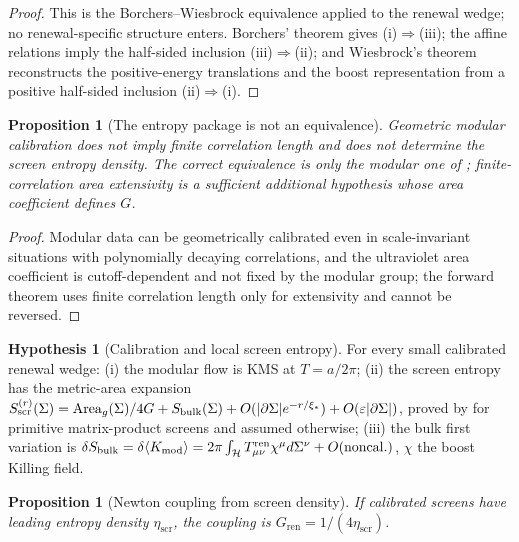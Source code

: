 \documentclass[11pt]{article}
\newtheorem{proposition}[theorem]{Proposition}
\theoremstyle{definition}
\newtheorem{hypothesis}[theorem]{Hypothesis}
\theoremstyle{remark}
\newcommand{\eps}{\varepsilon}
\newcommand{\Area}{\operatorname{Area}}
\newcommand{\Tren}{T^{\mathrm{ren}}}
\newcommand{\bulk}{\mathrm{bulk}}
\newcommand{\etaScr}{\eta_{\mathrm{scr}}}
\newcommand{\Gren}{G_{\mathrm{ren}}}
\begin{document}
\begin{proof}
This is the Borchers--Wiesbrock equivalence
\cite{Borchers,Wiesbrock,ArakiZsido2005} applied to the renewal wedge; no
renewal-specific structure enters.  Borchers' theorem gives (i)$\Rightarrow$(iii);
the affine relations imply the half-sided inclusion (iii)$\Rightarrow$(ii); and
Wiesbrock's theorem reconstructs the positive-energy translations and the boost
representation from a positive half-sided inclusion (ii)$\Rightarrow$(i).
\end{proof}

\begin{proposition}[The entropy package is not an equivalence]
\label{prop:entropy-no-iff}
Geometric modular calibration does not imply finite correlation length and does
not determine the screen entropy density.  The correct equivalence is only the
modular one of ; finite-correlation area
extensivity is a sufficient additional hypothesis whose area coefficient defines
$G$.
\end{proposition}

\begin{proof}
Modular data can be geometrically calibrated even in scale-invariant situations
with polynomially decaying correlations, and the ultraviolet area coefficient is
cutoff-dependent and not fixed by the modular group; the forward theorem uses
finite correlation length only for extensivity and cannot be reversed.
\end{proof}

\begin{hypothesis}[Calibration and local screen entropy]
\label{hyp:calibration}
For every small calibrated renewal wedge: \textup{(i)} the modular flow is KMS at
$T=a/2\pi$; \textup{(ii)} the screen entropy has the metric-area expansion
$S_{\rm scr}^{(r)}(\Sigma)=\Area_g(\Sigma)/4G+S_{\bulk}(\Sigma)
+O(|\partial\Sigma|e^{-r/\xi_*})+O(\eps|\partial\Sigma|)$, proved by
 for primitive matrix-product screens and assumed
otherwise; \textup{(iii)} the bulk first variation is
$\delta S_{\bulk}=\delta\langle K_{\rm mod}\rangle
=2\pi\int_{\mathcal H}\Tren_{\mu\nu}\chi^\mu d\Sigma^\nu+O(\mathrm{noncal.})$, $\chi$
the boost Killing field.
\end{hypothesis}

\begin{proposition}[Newton coupling from screen density]
\label{prop:newton-from-screen-density}
If calibrated screens have leading entropy density $\etaScr$, the coupling is
$\Gren=1/(4\etaScr)$.
\end{proposition}
\end{document}
